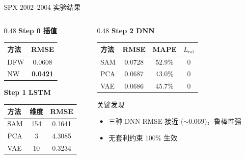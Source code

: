 \documentclass[aspectratio=169]{beamer}
\begin{document}
\begin{frame}{SPX 2002--2004 实验结果}
\begin{columns}
\begin{column}{0.48\textwidth}
\textbf{Step 0 插值}
\begin{table}
\centering
\small
\begin{tabular}{@{}lc@{}}
\toprule
方法 & RMSE \\
\midrule
DFW & 0.0608 \\
NW & \textbf{0.0421} \\
\bottomrule
\end{tabular}
\end{table}

\vspace{0.3cm}
\textbf{Step 1 LSTM}
\begin{table}
\centering
\small
\begin{tabular}{@{}lcc@{}}
\toprule
方法 & 维度 & RMSE \\
\midrule
SAM & 154 & 0.1641 \\
PCA & 3 & 4.3085 \\
VAE & 10 & 0.3234 \\
\bottomrule
\end{tabular}
\end{table}
\end{column}

\begin{column}{0.48\textwidth}
\textbf{Step 2 DNN}
\begin{table}
\centering
\small
\begin{tabular}{@{}lccc@{}}
\toprule
方法 & RMSE & MAPE & $L_{\text{cal}}$ \\
\midrule
SAM & 0.0728 & 52.9\% & 0 \\
PCA & 0.0687 & 43.0\% & 0 \\
VAE & 0.0686 & 45.7\% & 0 \\
\bottomrule
\end{tabular}
\end{table}

\vspace{0.3cm}
\begin{block}{关键发现}
\begin{itemize}
    \item 三种 DNN RMSE 接近 ($\sim$0.069)，鲁棒性强
    \item 无套利约束 100\% 生效
\end{itemize}
\end{block}
\end{column}
\end{columns}
\end{frame}
\end{document}
